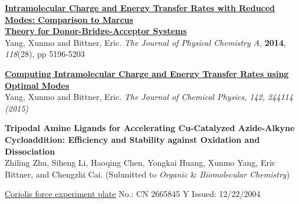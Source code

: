 \documentclass[12pt,letterpaper]{article}
\newcommand{\mhead}[1]{\leavevmode\marginpar{\sffamily\footnotesize #1}}
\begin{document}
\bigskip
\mhead{Publications}%
\href{http://pubs.acs.org/doi/abs/10.1021/jp503041y}{\textbf{Intramolecular Charge and Energy Transfer Rates with Reduced Modes: Comparison to Marcus}}\\
\href{http://pubs.acs.org/doi/abs/10.1021/jp503041y}{\textbf{Theory for Donor-Bridge-Acceptor Systems}}\\
Yang, Xunmo and Bittner, Eric. \emph{The Journal of Physical Chemistry A}, \textbf{2014}, \emph{118}(28), pp 5196-5203

\href{http://scitation.aip.org/content/aip/journal/jcp/142/24/10.1063/1.4923191}{\textbf{Computing Intramolecular Charge and Energy Transfer Rates using Optimal Modes}}\\
Yang, Xunmo and Bittner, Eric. \emph{The Journal of Chemical Physics, \emph{142}, 244114 (2015)}

\smallskip
\textbf{Tripodal Amine Ligands for Accelerating Cu-Catalyzed Azide-Alkyne Cycloaddition: Efficiency and Stability against Oxidation and Dissociation}\\
Zhiling Zhu, Siheng Li, Haoqing Chen, Yongkai Huang, Xunmo Yang, Eric Bittner, and Chengzhi Cai. (Submitted to \emph{Organic} \& \emph{Biomolecular Chemistry})


\bigskip
\mhead{Patent}%
\href{https://www.google.com/patents/CN2665845Y?cl=en}{Coriolis force experiment plate} \quad\quad\quad\quad No.: CN 2665845 Y  \quad\quad\quad\quad Issued: 12/22/2004
\end{document}
